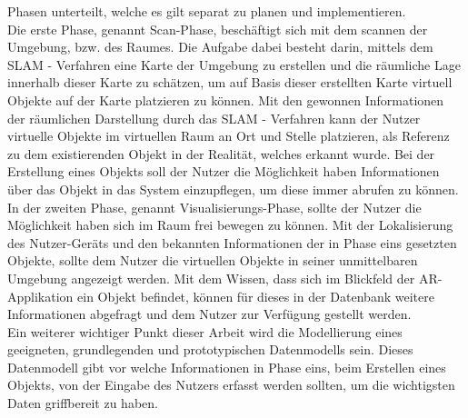 Phasen unterteilt, welche es gilt separat zu planen und implementieren.
\\ 
\linebreak
Die erste Phase, genannt Scan-Phase, beschäftigt sich mit dem scannen der Umgebung, bzw. des Raumes. Die Aufgabe dabei besteht darin, 
mittels dem \ac{SLAM} - Verfahren eine Karte der Umgebung zu erstellen und die räumliche Lage innerhalb dieser Karte zu schätzen, um 
auf Basis dieser erstellten Karte virtuell Objekte auf der Karte platzieren zu können. Mit den gewonnen Informationen der räumlichen 
Darstellung durch das \acs{SLAM} - Verfahren kann der Nutzer virtuelle Objekte im virtuellen Raum an Ort und Stelle platzieren, als 
Referenz zu dem existierenden Objekt in der Realität, welches erkannt wurde. Bei der Erstellung eines Objekts soll der Nutzer die 
Möglichkeit haben Informationen über das Objekt in das System einzupflegen, um diese immer abrufen zu können. 
\\ 
\linebreak
In der zweiten Phase, genannt Visualisierungs-Phase, sollte der Nutzer die Möglichkeit haben sich im Raum frei bewegen zu können. 
Mit der Lokalisierung des Nutzer-Geräts und den bekannten Informationen der in Phase eins gesetzten Objekte, sollte dem Nutzer 
die virtuellen Objekte in seiner unmittelbaren Umgebung angezeigt werden. Mit dem Wissen, dass sich im Blickfeld der \acs{AR}-Applikation 
ein Objekt befindet, können für dieses in der Datenbank weitere Informationen abgefragt und dem Nutzer zur Verfügung gestellt werden.
\\ 
\linebreak
Ein weiterer wichtiger Punkt dieser Arbeit wird die Modellierung eines geeigneten, grundlegenden und prototypischen Datenmodells sein. 
Dieses Datenmodell gibt vor welche Informationen in Phase eins, beim Erstellen eines Objekts, von der Eingabe des Nutzers 
erfasst werden sollten, um die wichtigsten Daten griffbereit zu haben. 


